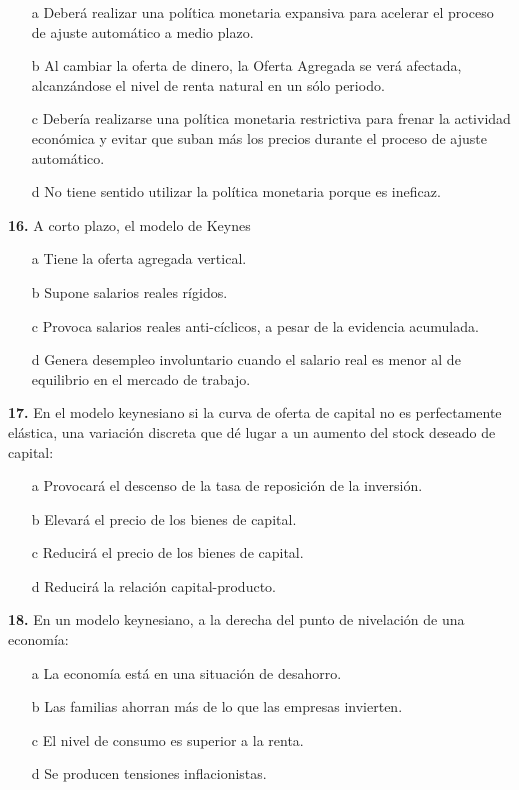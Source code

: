 \documentclass{nuevotema}
\begin{document}
\begin{enumerate}
	\item[a] Deberá realizar una política monetaria expansiva para acelerar el proceso de ajuste automático a medio plazo.
	\item[b] Al cambiar la oferta de dinero, la Oferta Agregada se verá afectada, alcanzándose el nivel de renta natural en un sólo periodo.
	\item[c] Debería realizarse una política monetaria restrictiva para frenar la actividad económica y evitar que suban más los precios durante el proceso de ajuste automático.
	\item[d] No tiene sentido utilizar la política monetaria porque es ineficaz.
\end{enumerate}

\textbf{16.} A corto plazo, el modelo de Keynes

\begin{enumerate}
	\item[a] Tiene la oferta agregada vertical.
	\item[b] Supone salarios reales rígidos.
	\item[c] Provoca salarios reales anti-cíclicos, a pesar de la evidencia acumulada.
	\item[d] Genera desempleo involuntario cuando el salario real es menor al de equilibrio en el mercado de trabajo.
\end{enumerate}

\textbf{17.} En el modelo keynesiano si la curva de oferta de capital no es perfectamente elástica, una variación discreta que dé lugar a un aumento del stock deseado de capital:
\begin{enumerate}
	\item[a] Provocará el descenso de la tasa de reposición de la inversión.
	\item[b] Elevará el precio de los bienes de capital.
	\item[c] Reducirá el precio de los bienes de capital.
	\item[d] Reducirá la relación capital-producto.
\end{enumerate}

\textbf{18.} En un modelo keynesiano, a la derecha del punto de nivelación de una economía:

\begin{enumerate}
	\item[a] La economía está en una situación de desahorro.
	\item[b] Las familias ahorran más de lo que las empresas invierten.
	\item[c] El nivel de consumo es superior a la renta.
	\item[d] Se producen tensiones inflacionistas.
\end{enumerate}
\end{document}
